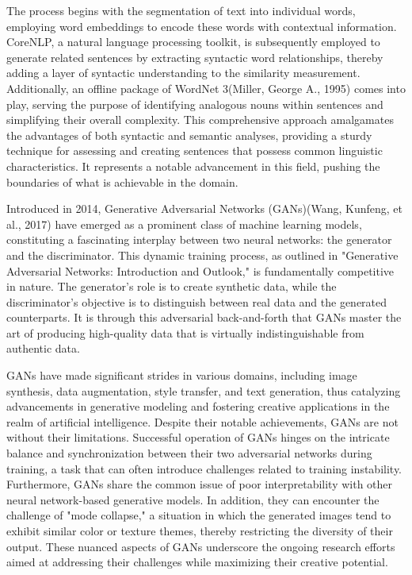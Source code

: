 \documentclass[fleqn,10pt]{thescipub} %
\begin{document}
The process begins with the segmentation of text into individual words, employing word embeddings to encode these words with contextual information. CoreNLP, a natural language processing toolkit, is subsequently employed to generate related sentences by extracting syntactic word relationships, thereby adding a layer of syntactic understanding to the similarity measurement. Additionally, an offline package of WordNet 3(Miller, George A., 1995) comes into play, serving the purpose of identifying analogous nouns within sentences and simplifying their overall complexity. This comprehensive approach amalgamates the advantages of both syntactic and semantic analyses, providing a sturdy technique for assessing and creating sentences that possess common linguistic characteristics. It represents a notable advancement in this field, pushing the boundaries of what is achievable in the domain.



Introduced in 2014, Generative Adversarial Networks (GANs)(Wang, Kunfeng, et al., 2017) have emerged as a prominent class of machine learning models, constituting a fascinating interplay between two neural networks: the generator and the discriminator. This dynamic training process, as outlined in "Generative Adversarial Networks: Introduction and Outlook," is fundamentally competitive in nature. The generator's role is to create synthetic data, while the discriminator's objective is to distinguish between real data and the generated counterparts. It is through this adversarial back-and-forth that GANs master the art of producing high-quality data that is virtually indistinguishable from authentic data.


GANs have made significant strides in various domains, including image synthesis, data augmentation, style transfer, and text generation, thus catalyzing advancements in generative modeling and fostering creative applications in the realm of artificial intelligence. Despite their notable achievements, GANs are not without their limitations. Successful operation of GANs hinges on the intricate balance and synchronization between their two adversarial networks during training, a task that can often introduce challenges related to training instability. Furthermore, GANs share the common issue of poor interpretability with other neural network-based generative models. In addition, they can encounter the challenge of "mode collapse," a situation in which the generated images tend to exhibit similar color or texture themes, thereby restricting the diversity of their output. These nuanced aspects of GANs underscore the ongoing research efforts aimed at addressing their challenges while maximizing their creative potential.
\end{document}
